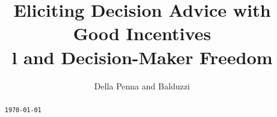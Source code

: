 



\title{Eliciting Decision Advice with Good Incentives\\l and Decision-Maker Freedom}

\author{Della Penna and Balduzzi}

\begin{abstract}%
  \begin{center}
    \texttt{\today}
  \end{center}
\end{abstract}

\maketitle





{


}


